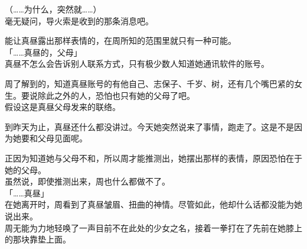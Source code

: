 （……为什么，突然就……）\\

毫无疑问，导火索是收到的那条消息吧。

能让真昼露出那样表情的，在周所知的范围里就只有一种可能。\\

「……真昼的，父母」\\

真昼不怎么会告诉别人联系方式，只有极少数人知道她通讯软件的账号。

周了解到的，知道真昼账号的有他自己、志保子、千岁、树，还有几个嘴巴紧的女生。要说除此之外的人，恐怕也只有她的父母了吧。\\

假设这是真昼父母发来的联络。

到昨天为止，真昼还什么都没讲过。今天她突然说来了事情，跑走了。这是不是因为她要和父母见面呢。

正因为知道她与父母不和，所以周才能推测出，她摆出那样的表情，原因恐怕在于她的父母。\\

虽然说，即使推测出来，周也什么都做不了。\\

「……真昼」\\

在她离开时，周看到了真昼皱眉、扭曲的神情。尽管如此，他却什么话都没能为她说出来。\\

周无能为力地轻唤了一声目前不在此处的少女之名，接着一拳打在了先前在她膝上的那块靠垫上面。
